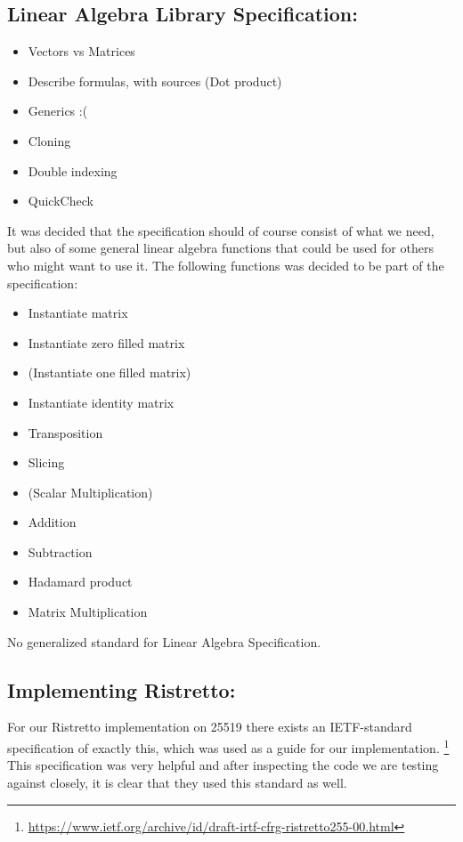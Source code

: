 \documentclass{article}
\begin{document}
\subsection{Linear Algebra Library Specification:}
\begin{itemize}
	\item Vectors vs Matrices 
	\item Describe formulas, with sources (Dot product) 
	\item Generics :(
	\item Cloning
	\item Double indexing
	\item QuickCheck
\end{itemize} 

It was decided that the specification should of course consist of what we
need, but also of some general linear algebra functions that could be
used for others who might want to use it. The following functions was
decided to be part of the specification:

\begin{itemize}
	\item Instantiate matrix
	\item Instantiate zero filled matrix
	\item (Instantiate one filled matrix)
	\item Instantiate identity matrix
	\item Transposition
	\item Slicing
	\item (Scalar Multiplication)
	\item Addition
	\item Subtraction
	\item Hadamard product
	\item Matrix Multiplication
\end{itemize}

No generalized standard for Linear Algebra Specification.

\subsection{Implementing Ristretto:} \label{implementing-ristretto}

For our Ristretto implementation on 25519 there
exists an IETF-standard specification of exactly
this, which was used as a guide for our implementation.
\footnote{\url{https://www.ietf.org/archive/id/draft-irtf-cfrg-ristretto255-00.html}}
This specification was very helpful and after inspecting the code we
are testing against closely, it is clear that they used this standard
as well.
\end{document}
